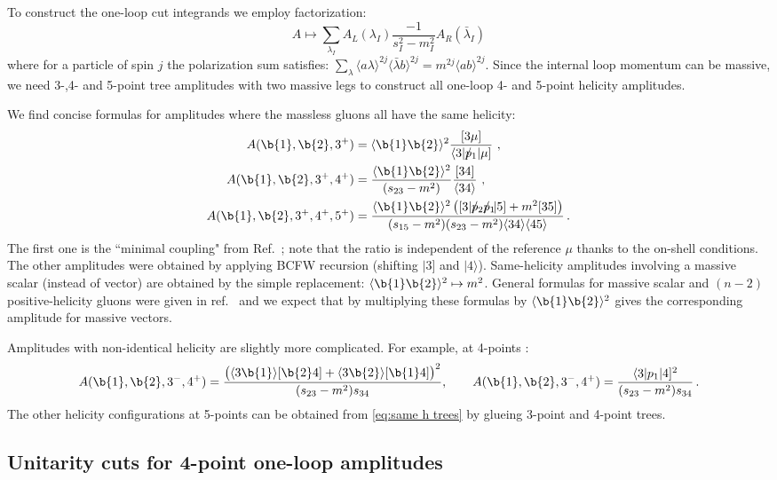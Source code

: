 \documentclass[11pt]{article}
\newcommand{\be}{\begin{equation}}
\newcommand{\ee}{\end{equation}}
\newcommand{\ab}[1]{\langle#1\rangle}
\renewcommand{\sb}[1]{[#1]}
\newcommand{\keta}[1]{|#1\rangle}
\newcommand{\kets}[1]{|#1]}
\newcommand{\braa}[1]{\langle#1|}
\newcommand{\bras}[1]{[#1|}
\newcommand{\pslash}{p\!\!\!/}
\begin{document}
To construct the one-loop cut integrands we employ factorization:
\be
 A \mapsto \sum_{\lambda_I} A_L(\lambda_I) \frac{-1}{s_I^2-m_I^2}  A_R(\bar\lambda_I)
\ee
where for a particle of spin $j$ the polarization sum satisfies:
$\sum_{\lambda} \ab{a \lambda}^{2j} \ab{\bar\lambda b}^{2j} = m^{2j} \ab{a b}^{2j}$.
Since the internal loop momentum can be massive, we need 3-,4- and 5-point tree amplitudes with two massive legs to construct all one-loop 4- and 5-point helicity amplitudes. 

We find concise formulas for amplitudes where the massless gluons all have the same helicity:
\be\begin{aligned} \label{eq:same h trees}
 A(\b{1},\b{2},3^+) &= \ab{\b{1}\b{2}}^2  \frac{\sb{3\mu}}{\braa{3}\pslash_1\kets{\mu}}\ , \\
 A(\b{1},\b{2},3^+,4^+) &= \frac{\ab{\b{1}\b{2}}^2}{(s_{23}-m^2)} \frac{\sb{34}}{\ab{34}}\ ,\\
 A(\b{1},\b{2},3^+,4^+,5^+) &= \frac{\ab{\b{1}\b{2}}^2\left( \bras{3}\pslash_2\pslash_1\!\kets{5}+m^2\sb{35}\right)}
 {(s_{15}-m^2)(s_{23}-m^2)\ab{34}\ab{45}}\,.
\end{aligned}\ee
The first one is the ``minimal coupling" from Ref.~\cite{Arkani-Hamed:2017jhn}; note that the ratio is independent of the reference $\mu$ thanks to the on-shell conditions. The other amplitudes
were obtained by applying BCFW recursion (shifting $\kets{3}$ and $\keta{4}$).
Same-helicity amplitudes involving a massive scalar (instead of vector) are obtained by the simple replacement:
$\ab{\b{1}\b{2}}^2\mapsto m^2$.
General formulas for massive scalar and $(n-2)$ positive-helicity gluons were given in ref.~\cite{Elvang:2011ub} and we expect that by multiplying these formulas by $\ab{\b{1}\b{2}}^2$ gives the corresponding amplitude for massive vectors. 

Amplitudes with non-identical helicity are slightly more complicated. For example, at 4-points \cite{Arkani-Hamed:2017jhn}:
\be
 A(\b{1},\b{2},3^-,4^+) = \frac{ \big(\ab{3\b{1}}\sb{\b{2}4}+\ab{3\b{2}}\sb{\b{1}4}\big)^2}{(s_{23}-m^2)s_{34}},
 \qquad
 A(\b{1},\b{2},3^-,4^+) = \frac{ \braa{3}p_1\kets{4}^2}{(s_{23}-m^2)s_{34}}\,.
\ee
The other helicity configurations at 5-points can be obtained from \eqref{eq:same h trees} by glueing 3-point and 4-point trees.


\subsection{Unitarity cuts for 4-point one-loop amplitudes \label{app:4pt helicity integrands}}
\end{document}
